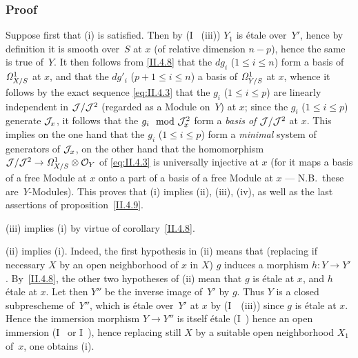 \subsubsection*{Proof}
Suppose first that (i) is satisfied. Then by (I~
(iii)) $Y_1$ is \'etale over~$Y'$, hence by definition it is
smooth over~$S$ at $x$ (of relative dimension $n-p$), hence the same
is true of~$Y$. It then follows from \eqref{II.4.8} that the $dg_i$
($1 \leq i \leq n$) form a basis of~$\it{\Omega}^1_{X/S}$ at $x$,
and that the $dg'_i$ ($p+1 \leq i \leq n$) a basis of
$\it{\Omega}^1_{Y/S}$ at $x$, whence it follows by the exact
sequence \eqref{eq:II.4.3} that the $g_i$ ($1 \leq i \leq p$) are
linearly independent in $\cal{J}/\cal{J}^2$
(regarded as a Module on~$Y$) at $x$; since the $g_i$ ($1
\leq i \leq p$) generate $\cal{J}_x$, it follows that the $g_i \mod
\cal{J}_x^2$ form a \emph{basis of} $\cal{J}/\cal{J}^2$ at
$x$. This implies on the one hand that the $g_i$ ($1 \leq i \leq p$)
form a \emph{minimal} system of generators of
$\cal{J}_x$, on the other hand that the homomorphism $\cal{J}/\cal{J}^2 \to
\it{\Omega}^1_{X/S} \otimes \cal{O}_Y$ of \eqref{eq:II.4.3} is
universally injective at $x$ (for it maps a basis of a free Module at $x$
onto a part of a basis of a free Module at $x$ --- N.B.\ these are~$Y$-Modules). This proves that (i) implies (ii),
(iii), (iv), as well as the last assertions of
proposition~\ref{II.4.9}.

(iii) implies (i) by virtue of corollary~\ref{II.4.8}.

(ii)
implies (i). Indeed, the first hypothesis in (ii)
means that (replacing if necessary $X$ by an open neighborhood of
$x$ in $X$) $g$ induces a morphism $h\colon Y \to
Y'$. By~\ref{II.4.8}, the other two hypotheses of (ii)
mean that $g$ is \'etale at $x$, and $h$ \'etale at $x$. Let
then $Y''$ be the inverse image of~$Y'$ by $g$. Thus $Y$ is a
closed subprescheme of~$Y''$, which is \'etale over~$Y'$
at $x$ by (I~~(iii)) since $g$ is \'etale at
$x$. Hence the immersion morphism $Y \to Y''$ is itself
\'etale (I~) hence an open immersion (I~ or
I~), hence replacing still $X$ by a suitable open
neighborhood $X_1$ of~$x$, one obtains (i).

